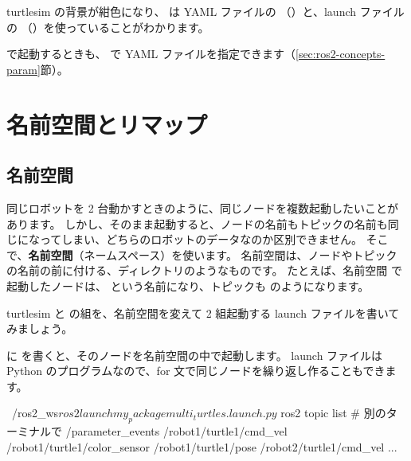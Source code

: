 turtlesim の背景が紺色になり、 は YAML ファイルの （）と、launch ファイルの （）を使っていることがわかります。

 で起動するときも、 で YAML ファイルを指定できます（\ref{sec:ros2-concepts-param}節）。


\section{名前空間とリマップ}
\label{sec:launch-namespace}

\subsection{名前空間}

同じロボットを 2 台動かすときのように、同じノードを複数起動したいことがあります。
しかし、そのまま起動すると、ノードの名前もトピックの名前も同じになってしまい、どちらのロボットのデータなのか区別できません。
そこで、\textbf{名前空間}（ネームスペース）を使います。
名前空間は、ノードやトピックの名前の前に付ける、ディレクトリのようなものです。
たとえば、名前空間  で起動したノードは、 という名前になり、トピックも  のようになります。

turtlesim と  の組を、名前空間を変えて 2 組起動する launch ファイルを書いてみましょう。


 に  を書くと、そのノードを名前空間の中で起動します。
launch ファイルは Python のプログラムなので、for 文で同じノードを繰り返し作ることもできます。

\begin{terminal}
~/ros2_ws$ ros2 launch my_package multi_turtles.launch.py
$ ros2 topic list      # 別のターミナルで
/parameter_events
/robot1/turtle1/cmd_vel
/robot1/turtle1/color_sensor
/robot1/turtle1/pose
/robot2/turtle1/cmd_vel
...
\end{terminal}

